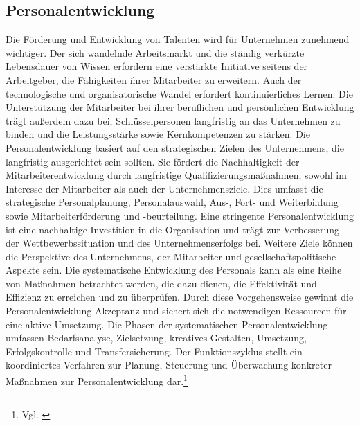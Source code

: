 \subsection{Personalentwicklung}
Die Förderung und Entwicklung von Talenten wird für Unternehmen zunehmend wichtiger. Der sich wandelnde Arbeitsmarkt und die ständig verkürzte Lebensdauer von Wissen erfordern eine verstärkte Initiative seitens der Arbeitgeber, die Fähigkeiten ihrer Mitarbeiter zu erweitern. Auch der technologische und organisatorische Wandel erfordert kontinuierliches Lernen. Die Unterstützung der Mitarbeiter bei ihrer beruflichen und persönlichen Entwicklung trägt außerdem dazu bei, Schlüsselpersonen langfristig an das Unternehmen zu binden und die Leistungsstärke sowie Kernkompetenzen zu stärken. Die Personalentwicklung basiert auf den strategischen Zielen des Unternehmens, die langfristig ausgerichtet sein sollten. Sie fördert die Nachhaltigkeit der Mitarbeiterentwicklung durch langfristige Qualifizierungsmaßnahmen, sowohl im Interesse der Mitarbeiter als auch der Unternehmensziele. Dies umfasst die strategische Personalplanung, Personalauswahl, Aus-, Fort- und Weiterbildung sowie Mitarbeiterförderung und -beurteilung. Eine stringente Personalentwicklung ist eine nachhaltige Investition in die Organisation und trägt zur Verbesserung der Wettbewerbssituation und des Unternehmenserfolgs bei. Weitere Ziele können die Perspektive des Unternehmens, der Mitarbeiter und gesellschaftspolitische Aspekte sein. Die systematische Entwicklung des Personals kann als eine Reihe von Maßnahmen betrachtet werden, die dazu dienen, die Effektivität und Effizienz zu erreichen und zu überprüfen. Durch diese Vorgehensweise gewinnt die Personalentwicklung Akzeptanz und sichert sich die notwendigen Ressourcen für eine aktive Umsetzung. Die Phasen der systematischen Personalentwicklung umfassen Bedarfsanalyse, Zielsetzung, kreatives Gestalten, Umsetzung, Erfolgskontrolle und Transfersicherung. Der Funktionszyklus stellt ein koordiniertes Verfahren zur Planung, Steuerung und Überwachung konkreter Maßnahmen zur Personalentwicklung dar.\footnote{Vgl. \cite{Bartscher2021}}

